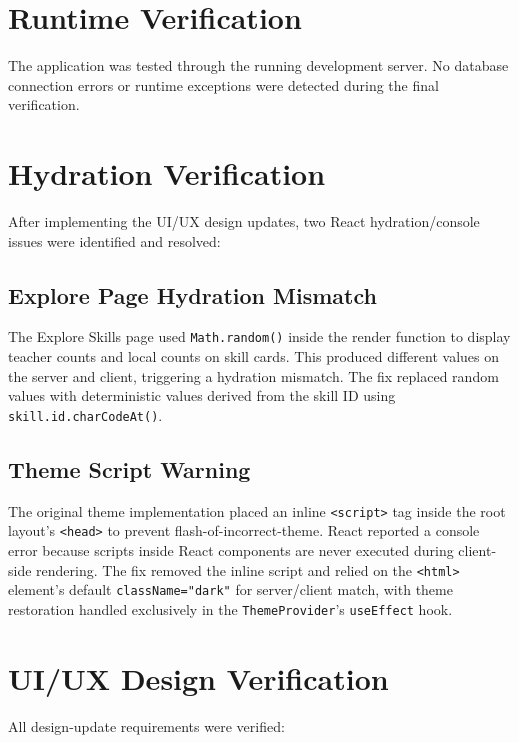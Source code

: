 \documentclass[12pt,a4paper]{report}
\begin{document}
\section{Runtime Verification}
The application was tested through the running development server.  No database
connection errors or runtime exceptions were detected during the final
verification.

\section{Hydration Verification}
After implementing the UI/UX design updates, two React hydration/console issues
were identified and resolved:

\subsection{Explore Page Hydration Mismatch}
The Explore Skills page used \texttt{Math.random()} inside the render function
to display teacher counts and local counts on skill cards.  This produced
different values on the server and client, triggering a hydration mismatch.  The
fix replaced random values with deterministic values derived from the skill ID
using \texttt{skill.id.charCodeAt()}.

\subsection{Theme Script Warning}
The original theme implementation placed an inline \texttt{<script>} tag inside
the root layout's \texttt{<head>} to prevent flash-of-incorrect-theme.  React
reported a console error because scripts inside React components are never
executed during client-side rendering.  The fix removed the inline script and
relied on the \texttt{<html>} element's default \texttt{className="dark"} for
server/client match, with theme restoration handled exclusively in the
\texttt{ThemeProvider}'s \texttt{useEffect} hook.

\section{UI/UX Design Verification}
All design-update requirements were verified:
\end{document}
